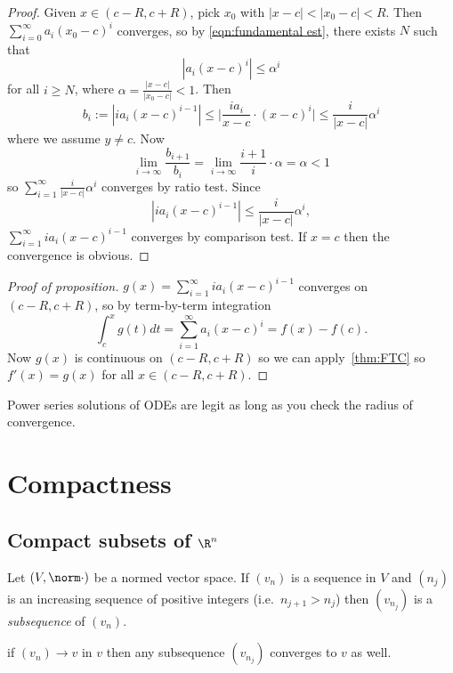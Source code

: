 \documentclass[a4paper]{article}
\theoremstyle{definition}
\begin{document}
\begin{proof}
  Given \(x\in(c-R,c+R)\), pick \(x_0\) with \(|x-c| < |x_0-c| < R\). Then \(\sum_{i=0}^{\infty}a_i(x_0-c)^i \) converges, so by \ref{eqn:fundamental est}, there exists \(N\) such that
  \[
    |a_i(x-c)^i| \leq \alpha^i
  \]
  for all \(i\geq N\), where \(\alpha = \frac{|x-c|}{|x_0-c|}<1\). Then
  \[
    b_i:= |i a_i (x-c)^{i-1}| \leq \Big| \frac{i a_i}{x-c}\cdot(x-c)^i \Big| \leq \frac{i}{|x-c|}\alpha^i
  \]
  where we assume \(y\neq c\). Now
  \[
    \lim_{i\to\infty} \frac{b_{i+1}}{b_i} = \lim_{i\to\infty} \frac{i+1}{i}\cdot\alpha = \alpha<1
  \]
  so \(\sum_{i=1}^{\infty}\frac{i}{|x-c|}\alpha^i \) converges by ratio test. Since
  \[
    |i a_i(x-c)^{i-1}| \leq \frac{i}{|x-c|}\alpha^i,
  \]
  \(\sum_{i=1}^{\infty}i a_i(x-c)^{i-1} \) converges by comparison test. If \(x=c\) then the convergence is obvious.
\end{proof}

\begin{proof}[Proof of proposition]
  \(g(x) = \sum_{i=1}^{\infty}i a_i (x-c)^{i-1} \) converges on \((c-R,c+R)\), so by term-by-term integration
  \[
    \int_{c}^{x} g(t) dt = \sum_{i=1}^{\infty}a_i(x-c)^i = f(x) - f(c).
  \]
  Now \(g(x)\) is continuous on \((c-R, c+R)\) so we can apply~\ref{thm:FTC} so \(f'(x) = g(x)\) for all \(x\in(c-R,c+R)\).
\end{proof}

\begin{application}
  Power series solutions of ODEs are legit as long as you check the radius of convergence.
\end{application}

\section{Compactness}

\subsection{Compact subsets of \texorpdfstring{\(\R^n\)}{Rn}}

Let \((V, \norm \cdot)\) be a normed vector space. If \((v_n)\) is a sequence in \(V\) and \((n_j)\) is an increasing sequence of positive integers (i.e.\ \(n_{j+1}>n_j\)) then \((v_{n_j})\) is a \emph{subsequence} of \((v_n)\).

\begin{ex}
  if \((v_n)\to v\) in \(v\) then any subsequence \((v_{n_j})\) converges to \(v\) as well.
\end{ex}
\end{document}
